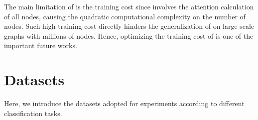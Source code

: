 \documentclass[sigconf, screen]{acmart}
\begin{document}
The main limitation of \name is the training cost since \name involves the attention calculation of all nodes, causing the quadratic computational complexity on the number of nodes. 
Such high training cost directly hinders the generalization of \name on large-scale graphs with millions of nodes.
Hence, optimizing the training cost of \name is one of the important future works. 







\newpage
\appendix

\section{Datasets}\label{app_dataset}
Here, we introduce the datasets adopted for experiments according to different classification tasks.
\begin{table}[ht]
\caption{Statistics on datasets for node classification, ranked by the homophily level from high to low.}
\label{tab:ncdata}
\centering
\renewcommand\arraystretch{1.0}
\small
{}
\end{table}
\end{document}

